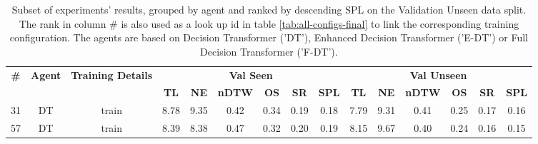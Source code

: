 \begin{table}
\centering
\caption{\label{tab:inflection_weights}Subset of experiments' results, grouped by agent and ranked by descending SPL on the Validation Unseen data split. The rank in column \# is also used as a look up id in table \ref{tab:all-configs-final} to link the corresponding training configuration.     \newline The agents are based on Decision Transformer ('DT'), Enhanced Decision Transformer ('E-DT') or Full Decision Transformer ('F-DT').}
\begin{tabular}{@{\hskip3pt}c@{\hskip3pt}c@{\hskip3pt}c@{\hskip3pt}c@{\hskip3pt}c@{\hskip3pt}c@{\hskip3pt}c@{\hskip3pt}c@{\hskip3pt}c@{\hskip3pt}c@{\hskip3pt}c@{\hskip3pt}c@{\hskip3pt}c@{\hskip3pt}c@{\hskip3pt}c}
\toprule
\textbf{\#} & \textbf{Agent} & \textbf{Training Details} & \multicolumn{6}{c}{\textbf{Val Seen}} & \multicolumn{6}{c}{\textbf{Val Unseen}} \\
 \textbf{~} &     \textbf{~} &                \textbf{~} &       \textbf{TL} & \textbf{NE} & \textbf{nDTW} & \textbf{OS} & \textbf{SR} & \textbf{SPL} &         \textbf{TL} & \textbf{NE} & \textbf{nDTW} & \textbf{OS} & \textbf{SR} & \textbf{SPL} \\
\midrule
         31 &             DT &                     train &              8.78 &        9.35 &          0.42 &        0.34 &        0.19 &         0.18 &                7.79 &        9.31 &          0.41 &        0.25 &        0.17 &         0.16 \\
         57 &             DT &                     train &              8.39 &        8.38 &          0.47 &        0.32 &        0.20 &         0.19 &                8.15 &        9.67 &          0.40 &        0.24 &        0.16 &         0.15 \\
\bottomrule
\end{tabular}
\end{table}
